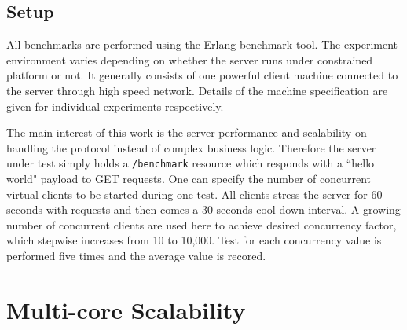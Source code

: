 


\subsection{Setup}

All benchmarks are performed using the Erlang benchmark tool. The experiment environment varies depending on whether the server runs under constrained platform or not. It generally consists of one powerful client machine connected to the server through high speed network. Details of the machine specification are given for individual experiments respectively.

The main interest of this work is the server performance and scalability on handling the protocol instead of complex business logic. Therefore the server under test simply holds a \verb|/benchmark| resource which responds with a ``hello world" payload to GET requests. One can specify the number of concurrent virtual clients to be started during one test. All clients stress the server for 60 seconds with requests and then comes a 30 seconds cool-down interval. A growing number of concurrent clients are used here to achieve desired concurrency factor, which stepwise increases from 10 to 10,000. Test for each concurrency value is performed five times and the average value is recored.  

\section{Multi-core Scalability} \label{multi_core_scalability}

